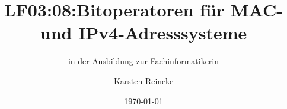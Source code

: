 \documentclass[]{beamer}
\title{LF03:08:Bitoperatoren für MAC- und IPv4-Adresssysteme}
\subtitle{in der Ausbildung zur Fachinformatikerin}
\institute{GS-LDK}
\author{Karsten Reincke}
\date{\today}
\def\cfgGl{../../../cfg.gl/}
\begin{document}

\begin{frame}
  \titlepage
\end{frame}






\logo{}
\newpage



%
\end{document}
